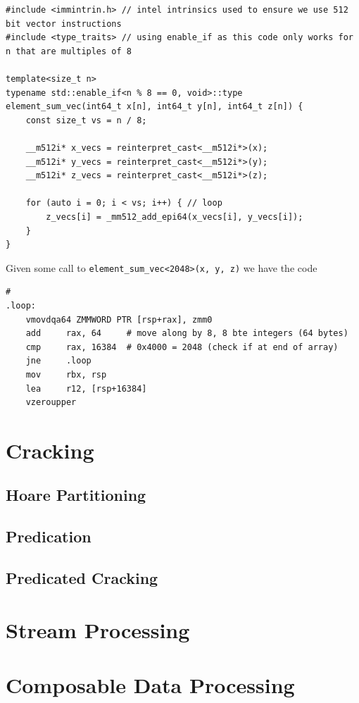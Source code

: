\begin{verbatim}
#include <immintrin.h> // intel intrinsics used to ensure we use 512 bit vector instructions
#include <type_traits> // using enable_if as this code only works for n that are multiples of 8

template<size_t n>
typename std::enable_if<n % 8 == 0, void>::type element_sum_vec(int64_t x[n], int64_t y[n], int64_t z[n]) { 
    const size_t vs = n / 8;
    
    __m512i* x_vecs = reinterpret_cast<__m512i*>(x);
    __m512i* y_vecs = reinterpret_cast<__m512i*>(y);
    __m512i* z_vecs = reinterpret_cast<__m512i*>(z);

    for (auto i = 0; i < vs; i++) { // loop
        z_vecs[i] = _mm512_add_epi64(x_vecs[i], y_vecs[i]);
    }
}
\end{verbatim}

Given some call to \texttt{element_sum_vec<2048>(x, y, z)} we have the code
\begin{verbatim}
# 
.loop:
    vmovdqa64 ZMMWORD PTR [rsp+rax], zmm0
    add     rax, 64     # move along by 8, 8 bte integers (64 bytes)
    cmp     rax, 16384  # 0x4000 = 2048 (check if at end of array)
    jne     .loop
    mov     rbx, rsp
    lea     r12, [rsp+16384]
    vzeroupper
\end{verbatim}

\section{Cracking}

\subsection{Hoare Partitioning}

\subsection{Predication}
\subsection{Predicated Cracking}
\section{Stream Processing}
\section{Composable Data Processing}

